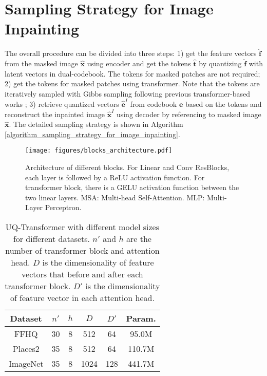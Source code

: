 \documentclass[10pt,twocolumn,letterpaper]{article}
\begin{document}
\section{Sampling Strategy for Image Inpainting}
\label{sec: sampling_strategy_supp}
 The overall procedure can be divided into three steps: 1) get the feature vectors $\mathbf{\hat{f}}$ from the masked image $\mathbf{\hat{x}}$ using encoder and get the tokens $\mathbf{\hat{t}}$ by quantizing $\mathbf{\hat{f}}$ with latent vectors in dual-codebook. The tokens for masked patches are not required; 2) get the tokens for masked patches using transformer. Note that the tokens are iteratively sampled with Gibbs sampling following previous transformer-based works \cite{radford2019language, ramesh2021zero, esser2021taming}; 3) retrieve quantized vectors $\mathbf{\hat{e}}^{I}$ from codebook $\mathbf{e}$ based on the tokens and reconstruct the inpainted image $\mathbf{\hat{x}}^{I}$ using decoder by referencing to masked image $\mathbf{\hat{x}}$. The detailed sampling strategy is shown in Algorithm \ref{algorithm_sampling_strategy_for_image_inpainting}.




\begin{figure}[tp]
	\centering
	\texttt{[image: figures/blocks\_architecture.pdf]} 
	\caption{Architecture of different blocks. For Linear and Conv ResBlocks, each layer is followed by a ReLU \cite{nair2010rectified} activation function. For transformer block, there is a GELU \cite{hendrycks2016gaussian} activation function between the two linear layers. MSA: Multi-head Self-Attention. MLP: Multi-Layer Perceptron.}
	\label{figure: blocks_architecture}
\end{figure}



\begin{table}[t]
\footnotesize
\centering
		\begin{tabular}{c|c|c|c|c|c}
			\hline
			Dataset  & $n'$ & $h$ & $D$ & $D'$ &Param. \\
			\hline 
			FFHQ \cite{karras2019style} & 30 & 8 &512 & 64 &95.0M\\
			Places2 \cite{zhou2017places} & 35 & 8 &512 & 64 &110.7M\\
            ImageNet \cite{deng2009imagenet} & 35 & 8 &1024 & 128 &441.7M\\
			\hline
		\end{tabular}
	\caption{UQ-Transformer with different model sizes for different datasets. $n'$ and $h$ are the number of transformer block and attention head. $D$ is the dimensionality of feature vectors that before and after each transformer block. $D'$ is the dimensionality of feature vector in each attention head.} 
	\label{tab: different_model_size_of_ut_transformer}
\end{table}	
\end{document}
